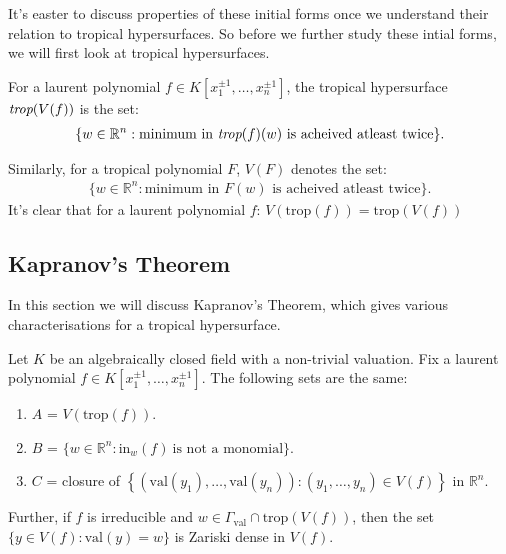     It's easter to discuss properties of these initial forms once we understand their relation to tropical hypersurfaces.
    So before we further study these intial forms, we will first look at tropical hypersurfaces.
    \begin{definition}
        For a laurent polynomial $f \in  K[x_{1}^{\pm1}, \dots, x_{n}^{\pm1}] $, the tropical hypersurface $\emph{trop}(V(f))$ is the set:
        \begin{align*}
        \{w \in \mathbb{R}^{n}: \text{minimum in }\emph{trop}(f)(w)\text{ is acheived atleast twice}\}.
        \end{align*}
    \end{definition}
    Similarly, for a tropical polynomial $F$, $V(F)$ denotes the set:
    \begin{align*}
        \{w \in \mathbb{R}^{n}: \text{minimum in }F(w)\text{ is acheived atleast twice}\}.
    \end{align*}
    It's clear that for a laurent polynomial $f$: $V(\text{trop}(f)) = \text{trop}(V(f))$

\subsection{Kapranov's Theorem}
In this section we will discuss Kapranov's Theorem, which gives various characterisations for a tropical hypersurface.
    \begin{theorem}
    Let $K$ be an algebraically closed field with a non-trivial valuation. Fix a laurent polynomial $f \in K[x_{1}^{\pm1}, \dots, x_{n}^{\pm1}]$. The following sets are the same:
    \begin{enumerate}
        \item $A$ = $V(\text{trop}(f))$.
        \item $B$ = $\{w \in \mathbb{R}^{n}: \text{in}_{w}(f)~ \text{is not a monomial}\}$.
        \item $C$ = closure of $\left\{(\text{val}(y_1), \dots, \text{val}(y_n)): (y_1,\dots, y_n) \in V(f)\right\}$ in $\mathbb{R}^{n}$.
    \end{enumerate}
    Further, if $f$ is irreducible and $w \in \Gamma_{\text{val}} \cap \text{trop}(V(f))$, then the set $\{y \in V(f): \text{val}(y) = w\}$ is Zariski dense in $V(f)$.
    \end{theorem}

